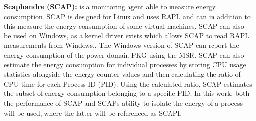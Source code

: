 
\noindent\textbf{Scaphandre (SCAP):} is a monitoring agent able to measure energy consumption.\cite{scaphandre} SCAP is designed for Linux and uses RAPL and can in addition to this measure the energy consumption of some virtual machines. SCAP can also be used on Windows, as a kernel driver exists which allows SCAP to read RAPL measurements from Windows.\cite{RAPL_Windows}. %
The Windows version of SCAP can report the energy consumption of the power domain PKG using the MSR. SCAP can also estimate the energy consumption for individual processes by storing CPU usage statistics alongside the energy counter values and then calculating the ratio of CPU time for each Process ID (PID). Using the calculated ratio, SCAP estimates the subset of energy consumption belonging to a specific PID. In this work, both the performance of SCAP and SCAPs ability to isolate the energy of a process will be used, where the latter will be referenced as SCAPI.

